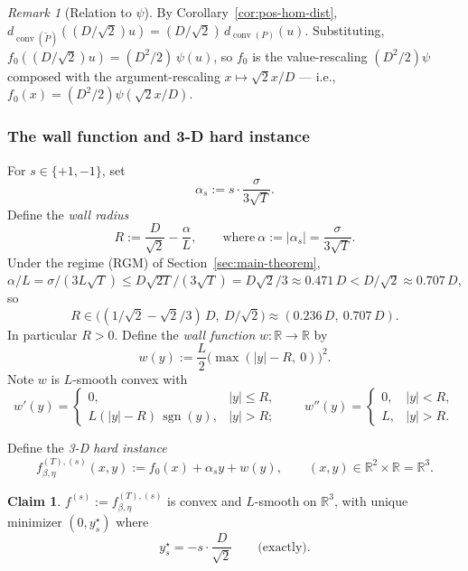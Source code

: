 \documentclass[11pt]{article}
\theoremstyle{definition}
\newtheorem{claim}[theorem]{Claim}
\theoremstyle{remark}
\newtheorem{remark}[theorem]{Remark}
\DeclareMathOperator{\sgn}{sgn}
\DeclareMathOperator{\conv}{conv}
\begin{document}
\begin{remark}[Relation to $\psi$]
By Corollary~\ref{cor:pos-hom-dist}, $d_{\conv(\widetilde P)}((D/\sqrt 2) u) = (D/\sqrt 2)\, d_{\conv(P)}(u)$. Substituting, $f_0((D/\sqrt 2) u) = (D^2/2)\, \psi(u)$, so $f_0$ is the value-rescaling $(D^2/2)\psi$ composed with the argument-rescaling $x \mapsto \sqrt 2 x / D$ --- i.e., $f_0(x) = (D^2/2)\psi(\sqrt 2 x/D)$.
\end{remark}

\subsubsection{The wall function and 3-D hard instance}

For $s \in \{+1, -1\}$, set
\begin{equation}
  \alpha_s := s \cdot \frac{\sigma}{3\sqrt T}.\tag{ALPHA}
\end{equation}
Define the \emph{wall radius}
\begin{equation}
  R := \frac{D}{\sqrt 2} - \frac{\alpha}{L}, \qquad \text{where}\ \alpha := |\alpha_s| = \frac{\sigma}{3\sqrt T}.\tag{R-def}
\end{equation}
Under the regime (RGM) of Section~\ref{sec:main-theorem}, $\alpha/L = \sigma/(3L\sqrt T) \leq D\sqrt{2T}/(3\sqrt T) = D\sqrt 2/3 \approx 0.471\,D < D/\sqrt 2 \approx 0.707\,D$, so
\[
  R \in \big((1/\sqrt 2 - \sqrt 2/3)\,D,\ D/\sqrt 2\big) \approx (0.236\,D,\ 0.707\,D).
\]
In particular $R > 0$. Define the \emph{wall function} $w : \mathbb{R} \to \mathbb{R}$ by
\[
  w(y) := \frac{L}{2}\big(\max(|y| - R,\ 0)\big)^2.
\]
Note $w$ is $L$-smooth convex with
\[
  w'(y) = \begin{cases}0, & |y| \leq R, \\ L(|y| - R)\,\sgn(y), & |y| > R;\end{cases}\qquad w''(y) = \begin{cases}0, & |y| < R, \\ L, & |y| > R.\end{cases}
\]

Define the \emph{3-D hard instance}
\begin{equation}
  f_{\beta,\eta}^{(T),(s)}(x, y) := f_0(x) + \alpha_s y + w(y),\qquad (x, y) \in \mathbb{R}^2 \times \mathbb{R} = \mathbb{R}^3.\tag{F}
\end{equation}

\begin{claim}
\label{cl:f-regularity}
$f^{(s)} := f_{\beta,\eta}^{(T),(s)}$ is convex and $L$-smooth on $\mathbb{R}^3$, with unique minimizer $(0, y^\star_s)$ where
\[
  y^\star_s = -s \cdot \frac{D}{\sqrt 2}\qquad \text{(exactly).}
\]
\end{claim}
\end{document}
